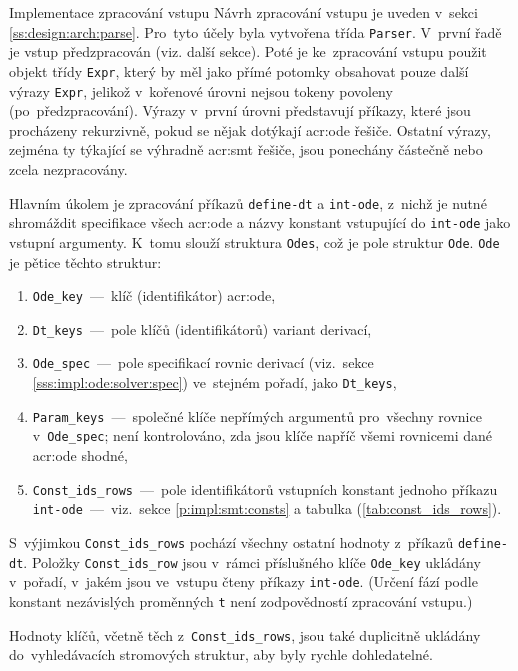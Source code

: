 \documentclass[thesis=M,czech]{FITthesis}[2012/06/26]
\newcommand{\acrlabel}[1]{acr:#1}
\newcommand{\acr}[1]{\acrshort{\acrlabel{#1}}}
\newcommand{\id}[1]{\texttt{#1}}
\newcommand{\rf}[1]{\ref{#1}}
\newcommand{\tabL}{tab}
\newcommand{\rfTab}[1]{(\rf{\tabL:#1})}
\begin{document}

\begin{section}{Implementace zpracování vstupu}\label{s:impl:parse}
Návrh zpracování vstupu je uveden v~sekci \rf{ss:design:arch:parse}.
Pro~tyto účely byla vytvořena třída \id{Parser}.
V~první řadě je vstup předzpracován (viz. další sekce).
Poté je ke~zpracování vstupu použit objekt třídy \id{Expr},
který by měl jako přímé potomky obsahovat pouze další výrazy \id{Expr},
jelikož v~kořenové úrovni nejsou tokeny povoleny
(po~předzpracování).
Výrazy v~první úrovni představují příkazy,
které jsou procházeny rekurzivně,
pokud se nějak dotýkají \acr{ode} řešiče.
Ostatní výrazy, zejména ty týkající se výhradně \acr{smt} řešiče,
jsou ponechány částečně nebo zcela nezpracovány.

Hlavním úkolem je zpracování příkazů \id{define\--dt} a \id{int\--ode},
z~nichž je nutné shromáždit specifikace všech \acr{ode}
a názvy konstant vstupující do \id{int\--ode} jako vstupní argumenty.
K~tomu slouží struktura \id{Odes},
což je pole struktur \id{Ode}.
\id{Ode} je pětice těchto struktur:
\begin{enumerate}
\item \id{Ode\_\-key}~---~klíč (identifikátor) \acr{ode},
\item \id{Dt\_\-keys}~---~pole klíčů (identifikátorů) variant derivací,
\item \id{Ode\_\-spec}~---~pole specifikací rovnic derivací
   (viz.~sekce \rf{sss:impl:ode:solver:spec})
   ve~stejném pořadí, jako \id{Dt\_\-keys},
\item \id{Param\_\-keys}~---~společné klíče nepřímých argumentů
   pro~všechny rovnice v~\id{Ode\_\-spec};
   není kontrolováno, zda jsou klíče napříč všemi rovnicemi
   dané \acr{ode} shodné,
\item \id{Const\_\-ids\_\-rows}~---~pole identifikátorů
   vstupních konstant jednoho příkazu
   \id{int\--ode}~---~viz.~sekce \rf{p:impl:smt:consts}
   a tabulka \rfTab{const_ids_rows}.
\end{enumerate}
S~výjimkou \id{Const\_\-ids\_\-rows}
pochází všechny ostatní hodnoty
z~příkazů \id{define\--dt}.
Položky \id{Const\_\-ids\_\-row} jsou v~rámci
příslušného klíče \id{Ode\_\-key} ukládány v~pořadí,
v~jakém jsou ve~vstupu čteny příkazy \id{int\--ode}.
(Určení fází podle konstant nezávislých proměnných \id{t}
není zodpovědností zpracování vstupu.)

Hodnoty klíčů, včetně těch z~\id{Const\_\-ids\_\-rows},
jsou také duplicitně ukládány
do~vyhledávacích stromových struktur,
aby byly rychle dohledatelné.


\end{section}
\end{document}

